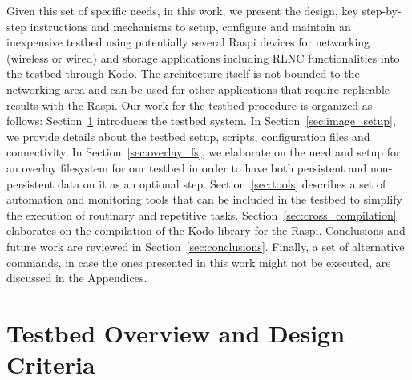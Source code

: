 \documentclass[electronics,article,accept,moreauthors,pdftex,10pt,a4paper]{mdpi}
\theoremstyle{mdpi}
\newcounter{ex}
\newcounter{re}
\theoremstyle{mdpidefinition}
\begin{document}
Given this set of specific needs, in this work, we present the design, key step-by-step instructions and mechanisms to setup, configure and maintain an inexpensive testbed using potentially several Raspi devices for networking (wireless or wired) and storage applications including RLNC functionalities into the testbed through Kodo. The architecture itself is not bounded to the networking area and can be used for other applications that require replicable results with the Raspi. Our work for the testbed procedure is organized as follows: Section~\ref{sec:overview} introduces the testbed system. In Section~\ref{sec:image_setup}, we provide details about the testbed setup, scripts, configuration files and connectivity. In Section~\ref{sec:overlay_fs}, we elaborate on the need and setup for an overlay filesystem for our testbed in order to have both persistent and non-persistent data on it as an optional step. Section~\ref{sec:tools} describes a set of automation and monitoring tools that can be included in the testbed to simplify the execution of routinary and repetitive tasks. Section~\ref{sec:cross_compilation} elaborates on the compilation of the Kodo library for the Raspi. Conclusions and future work are reviewed in Section~\ref{sec:conclusions}. Finally, a set of alternative commands, in case the ones presented in this work might not be executed, are discussed in the Appendices.



\section{Testbed Overview and Design Criteria}
%
\label{sec:overview}
\end{document}
